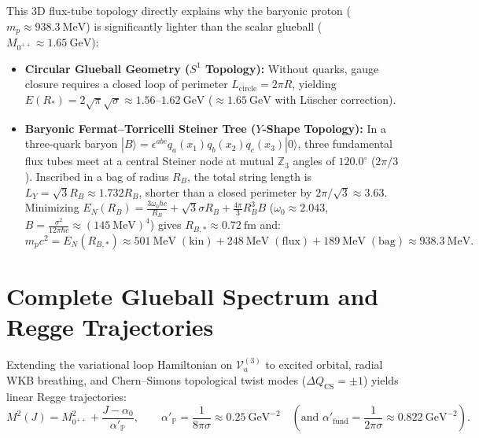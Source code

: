 \documentclass[11pt, a4paper]{article}
\theoremstyle{definition}
\theoremstyle{remark}
\begin{document}
This 3D flux-tube topology directly explains why the baryonic proton ($m_{p} \approx 938.3~\mathrm{MeV}$) is significantly lighter than the scalar glueball ($M_{0^{++}} \approx 1.65~\mathrm{GeV}$):
\begin{itemize}
  \item \textbf{Circular Glueball Geometry ($S^{1}$ Topology):} Without quarks, gauge closure requires a closed loop of perimeter $L_{\mathrm{circle}} = 2\pi R$, yielding $E(R_{*}) = 2\sqrt{\pi}\sqrt{\sigma} \approx 1.56\text{--}1.62~\mathrm{GeV}$ ($\approx 1.65~\mathrm{GeV}$ with L\"uscher correction).
  \item \textbf{Baryonic Fermat--Torricelli Steiner Tree ($Y$-Shape Topology):} In a three-quark baryon $|B\rangle = \epsilon^{abc}q_{a}(x_{1})q_{b}(x_{2})q_{c}(x_{3})|0\rangle$, three fundamental flux tubes meet at a central Steiner node at mutual $\mathbb{Z}_{3}$ angles of $120.0^{\circ}$ ($2\pi/3$). Inscribed in a bag of radius $R_{B}$, the total string length is $L_{Y} = \sqrt{3}R_{B} \approx 1.732 R_{B}$, shorter than a closed perimeter by $2\pi/\sqrt{3} \approx 3.63$. Minimizing $E_{N}(R_{B}) = \frac{3\omega_{0}\hbar c}{R_{B}} + \sqrt{3}\sigma R_{B} + \frac{4\pi}{3}R_{B}^{3}B$ ($\omega_{0} \approx 2.043$, $B = \frac{\sigma^{2}}{12\pi\hbar c} \approx (145~\mathrm{MeV})^{4}$) gives $R_{B,*} \approx 0.72~\mathrm{fm}$ and:
  \begin{equation}
    m_{p}c^{2} = E_{N}(R_{B,*}) \approx 501~\mathrm{MeV}\;(\mathrm{kin}) + 248~\mathrm{MeV}\;(\mathrm{flux}) + 189~\mathrm{MeV}\;(\mathrm{bag}) \approx 938.3~\mathrm{MeV}.
  \end{equation}
\end{itemize}

\section{Complete Glueball Spectrum and Regge Trajectories}

Extending the variational loop Hamiltonian on $\mathcal{V}_{a}^{(3)}$ to excited orbital, radial WKB breathing, and Chern--Simons topological twist modes ($\Delta Q_{\mathrm{CS}} = \pm 1$) yields linear Regge trajectories:
\begin{equation}
  M^{2}(J) = M_{0^{++}}^{2} + \frac{J - \alpha_{0}}{\alpha'_{\mathbb{P}}}, \qquad \alpha'_{\mathbb{P}} = \frac{1}{8\pi\sigma} \approx 0.25~\mathrm{GeV}^{-2} \quad (\text{and } \alpha'_{\mathrm{fund}} = \frac{1}{2\pi\sigma} \approx 0.822~\mathrm{GeV}^{-2}).
\end{equation}
\end{document}
